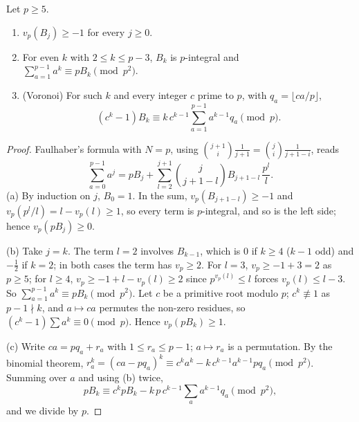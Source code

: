 \begin{lemma}\label{lem:bernp}
Let $p\ge5$.
\begin{enumerate}[label=(\alph*)]
\item $v_p(B_j)\ge-1$ for every $j\ge0$.
\item For even $k$ with $2\le k\le p-3$, $B_k$ is $p$-integral and $\sum_{a=1}^{p-1}a^k\equiv pB_k\pmod{p^2}$.
\item (Voronoi) For such $k$ and every integer $c$ prime to $p$, with $q_a=\lfloor ca/p\rfloor$,
\[
(c^k-1)B_k\equiv k\,c^{k-1}\sum_{a=1}^{p-1}a^{k-1}q_a\pmod p.
\]
\end{enumerate}
\end{lemma}
\begin{proof}
Faulhaber's formula with $N=p$, using $\binom{j+1}i\frac1{j+1}=\binom ji\frac1{j+1-i}$, reads
\[
\sum_{a=0}^{p-1}a^j=pB_j+\sum_{l=2}^{j+1}\binom j{j+1-l}B_{j+1-l}\,\frac{p^l}l.
\]
(a) By induction on $j$, $B_0=1$. In the sum, $v_p(B_{j+1-l})\ge-1$ and $v_p(p^l/l)=l-v_p(l)\ge1$, so every term is $p$-integral, and so is
the left side; hence $v_p(pB_j)\ge0$.

(b) Take $j=k$. The term $l=2$ involves $B_{k-1}$, which is $0$ if $k\ge4$ ($k-1$ odd) and $-\frac12$ if $k=2$; in both cases the term has
$v_p\ge2$. For $l=3$, $v_p\ge-1+3=2$ as $p\ge5$; for $l\ge4$, $v_p\ge-1+l-v_p(l)\ge2$ since $p^{v_p(l)}\le l$ forces $v_p(l)\le l-3$. So
$\sum_{a=1}^{p-1}a^k\equiv pB_k\pmod{p^2}$. Let $c$ be a primitive root modulo $p$; $c^k\not\equiv1$ as $p-1\nmid k$, and $a\mapsto ca$
permutes the non-zero residues, so $(c^k-1)\sum a^k\equiv0\pmod p$. Hence $v_p(pB_k)\ge1$.

(c) Write $ca=pq_a+r_a$ with $1\le r_a\le p-1$; $a\mapsto r_a$ is a permutation. By the binomial theorem, $r_a^k=(ca-pq_a)^k\equiv
c^ka^k-k\,c^{k-1}a^{k-1}pq_a\pmod{p^2}$. Summing over $a$ and using (b) twice,
\[
pB_k\equiv c^kpB_k-k\,p\,c^{k-1}\sum_aa^{k-1}q_a\pmod{p^2},
\]
and we divide by $p$.
\end{proof}

